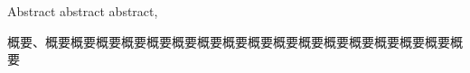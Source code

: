 \begin{eabstract}
  Abstract abstract abstract, 
\end{eabstract}
\begin{jabstract}
  概要、概要概要概要概要概要概要概要概要概要概要概要概要概要概要概要概要概要
\end{jabstract}